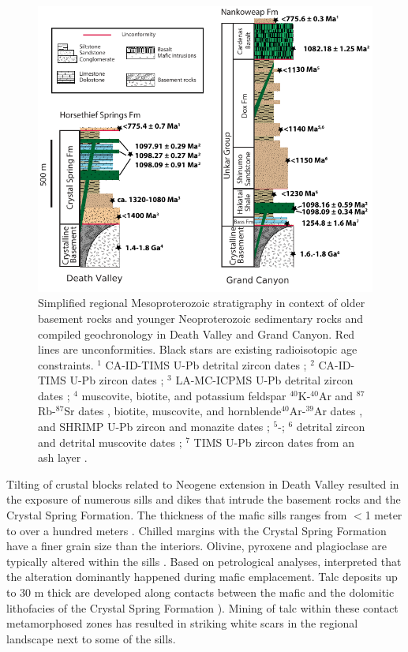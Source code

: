 \documentclass[draft]{agujournal2019}
\begin{document}
\begin{figure}[h!]
\centering
\includegraphics[width=\textwidth]{DV_GC_Mesoproterozoic_strat_columns.pdf}
\caption{\footnotesize Simplified regional Mesoproterozoic stratigraphy in context of older basement rocks and younger Neoproterozoic sedimentary rocks and compiled geochronology in Death Valley and Grand Canyon. Red lines are unconformities. Black stars are existing radioisotopic age constraints. $^1$ CA-ID-TIMS U-Pb detrital zircon dates \cite{Dehler2023a}; $^2$ CA-ID-TIMS U-Pb zircon dates \cite{Mohr2024a}; $^3$ LA-MC-ICPMS U-Pb detrital zircon dates \cite{Mahon2014b}; $^4$ muscovite, biotite, and potassium feldspar $^{40}$K-$^{40}$Ar and $^{87}$Rb-$^{87}$Sr dates \cite{Lanphere1964b}, biotite, muscovite, and hornblende$^{40}$Ar-$^{39}$Ar dates , and SHRIMP U-Pb zircon and monazite dates ; $^5$-; $^6$ detrital zircon and detrital muscovite dates ; $^7$ TIMS U-Pb zircon dates from an ash layer .}
\label{fig:DV_GC_strat_columns}
\end{figure}

Tilting of crustal blocks related to Neogene extension in Death Valley resulted in the exposure of numerous sills and dikes that intrude the basement rocks and the Crystal Spring Formation. The thickness of the mafic sills ranges from $<$1 meter to over a hundred meters \cite{Wright1968a, Hammond1983a}. Chilled margins with the Crystal Spring Formation have a finer grain size than the interiors. Olivine, pyroxene and plagioclase are typically altered within the sills \cite{Hammond1983a}. Based on petrological analyses,  interpreted that the alteration dominantly happened during mafic emplacement. Talc deposits up to 30 m thick are developed along contacts between the mafic and the dolomitic lithofacies of the Crystal Spring Formation \cite{Wright1968a}). Mining of talc within these contact metamorphosed zones has resulted in striking white scars in the regional landscape next to some of the sills.
\end{document}
